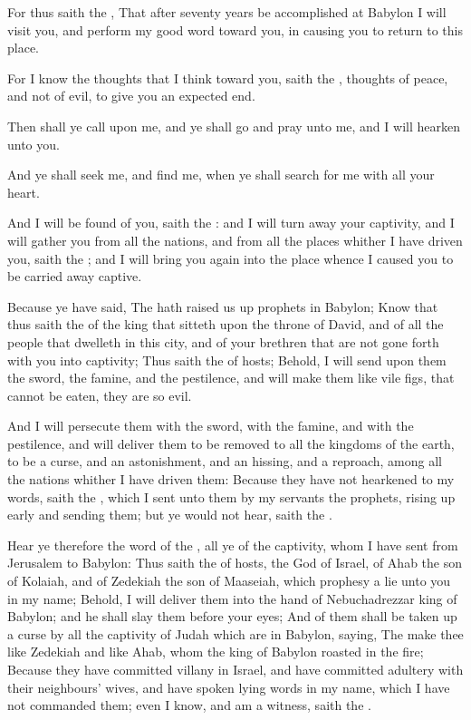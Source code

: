 \verse For thus saith the \LORD, That after seventy years be accomplished at Babylon I will visit you, and perform my good word toward you, in causing you to return to this place.

\verse For I know the thoughts that I think toward you, saith the \LORD, thoughts of peace, and not of evil, to give you an expected end.

\verse Then shall ye call upon me, and ye shall go and pray unto me, and I will hearken unto you.

\verse And ye shall seek me, and find me, when ye shall search for me with all your heart.

\verse And I will be found of you, saith the \LORD: and I will turn away your captivity, and I will gather you from all the nations, and from all the places whither I have driven you, saith the \LORD; and I will bring you again into the place whence I caused you to be carried away captive.

\verse Because ye have said, The \LORD hath raised us up prophets in Babylon; \verse Know that thus saith the \LORD of the king that sitteth upon the throne of David, and of all the people that dwelleth in this city, and of your brethren that are not gone forth with you into captivity; \verse Thus saith the \LORD of hosts; Behold, I will send upon them the sword, the famine, and the pestilence, and will make them like vile figs, that cannot be eaten, they are so evil.

\verse And I will persecute them with the sword, with the famine, and with the pestilence, and will deliver them to be removed to all the kingdoms of the earth, to be a curse, and an astonishment, and an hissing, and a reproach, among all the nations whither I have driven them: \verse Because they have not hearkened to my words, saith the \LORD, which I sent unto them by my servants the prophets, rising up early and sending them; but ye would not hear, saith the \LORD.

\verse Hear ye therefore the word of the \LORD, all ye of the captivity, whom I have sent from Jerusalem to Babylon: \verse Thus saith the \LORD of hosts, the God of Israel, of Ahab the son of Kolaiah, and of Zedekiah the son of Maaseiah, which prophesy a lie unto you in my name; Behold, I will deliver them into the hand of Nebuchadrezzar king of Babylon; and he shall slay them before your eyes; \verse And of them shall be taken up a curse by all the captivity of Judah which are in Babylon, saying, The \LORD make thee like Zedekiah and like Ahab, whom the king of Babylon roasted in the fire; \verse Because they have committed villany in Israel, and have committed adultery with their neighbours' wives, and have spoken lying words in my name, which I have not commanded them; even I know, and am a witness, saith the \LORD.

